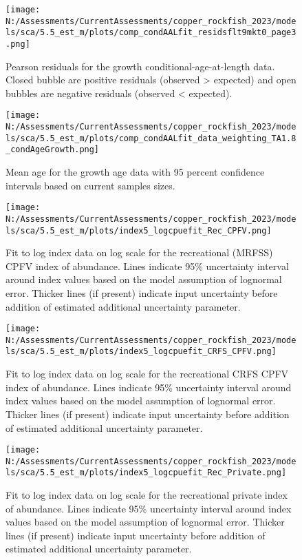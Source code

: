 \documentclass[11pt,
  english,
  letterpaper,
]{article}
\begin{document}
\begin{figure}
\centering
\texttt{[image: N:/Assessments/CurrentAssessments/copper\_rockfish\_2023/models/sca/5.5\_est\_m/plots/comp\_condAALfit\_residsflt9mkt0\_page3.png]}
\caption{Pearson residuals for the growth conditional-age-at-length data. Closed bubble are positive residuals (observed \textgreater{} expected) and open bubbles are negative residuals (observed \textless{} expected).\label{fig:growth-age-pearson-3}}
\end{figure}

\begin{figure}
\centering
\texttt{[image: N:/Assessments/CurrentAssessments/copper\_rockfish\_2023/models/sca/5.5\_est\_m/plots/comp\_condAALfit\_data\_weighting\_TA1.8\_condAgeGrowth.png]}
\caption{Mean age for the growth age data with 95 percent confidence intervals based on current samples sizes.\label{fig:growth-mean-age-fit}}
\end{figure}

\begin{figure}
\centering
\texttt{[image: N:/Assessments/CurrentAssessments/copper\_rockfish\_2023/models/sca/5.5\_est\_m/plots/index5\_logcpuefit\_Rec\_CPFV.png]}
\caption{Fit to log index data on log scale for the recreational (MRFSS) CPFV index of abundance. Lines indicate 95\% uncertainty interval around index values based on the model assumption of lognormal error. Thicker lines (if present) indicate input uncertainty before addition of estimated additional uncertainty parameter.\label{fig:mrfss-cpfv-index-fit}}
\end{figure}

\begin{figure}
\centering
\texttt{[image: N:/Assessments/CurrentAssessments/copper\_rockfish\_2023/models/sca/5.5\_est\_m/plots/index5\_logcpuefit\_CRFS\_CPFV.png]}
\caption{Fit to log index data on log scale for the recreational CRFS CPFV index of abundance. Lines indicate 95\% uncertainty interval around index values based on the model assumption of lognormal error. Thicker lines (if present) indicate input uncertainty before addition of estimated additional uncertainty parameter.\label{fig:crfs-cpfv-index-fit}}
\end{figure}

\begin{figure}
\centering
\texttt{[image: N:/Assessments/CurrentAssessments/copper\_rockfish\_2023/models/sca/5.5\_est\_m/plots/index5\_logcpuefit\_Rec\_Private.png]}
\caption{Fit to log index data on log scale for the recreational private index of abundance. Lines indicate 95\% uncertainty interval around index values based on the model assumption of lognormal error. Thicker lines (if present) indicate input uncertainty before addition of estimated additional uncertainty parameter.\label{fig:crfs-pr-index-fit}}
\end{figure}
\end{document}
